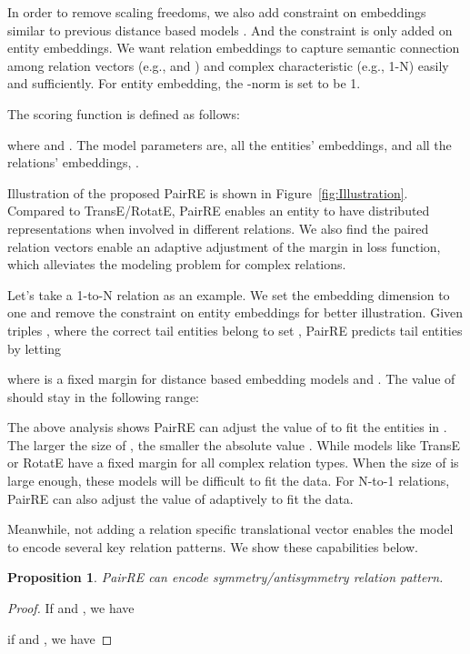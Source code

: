 \documentclass[11pt,a4paper]{article}
\newtheorem{proposition}{Proposition}
\begin{document}
In order to remove scaling freedoms, we also add constraint on embeddings similar to previous distance based models \cite{bordes2013translating,wang2014knowledge, lin2015learning}. And the constraint is only added on entity embeddings. We want relation embeddings to capture semantic connection among relation vectors (e.g.,  and ) and complex characteristic (e.g., 1-N) easily and sufficiently. For entity embedding, the -norm is set to be 1.

The scoring function is defined as follows:

where  and .
The model parameters are, all the entities’ embeddings,  and all the relations’ embeddings,
.

Illustration of the proposed PairRE is shown in Figure~\ref{fig:Illustration}.
Compared to TransE/RotatE, PairRE enables an entity to have distributed representations when involved in different relations. We also find the paired relation vectors enable an adaptive adjustment of the margin in loss function, which alleviates the modeling problem for complex relations. 

Let's take a 1-to-N relation as an example. We set the embedding dimension to one and remove the constraint on entity embeddings for better illustration.
Given triples , where the correct tail entities belong to set , PairRE predicts tail entities by letting 

where  is a fixed margin for distance based embedding models and .
The value of  should stay in the following range: 

The above analysis shows PairRE can adjust the value of  to fit the entities in  . The larger the size of , the smaller the absolute value . While models like TransE or RotatE have a fixed margin for all complex relation types. When the size of  is large enough, these models will be difficult to fit the data. For N-to-1 relations, PairRE can also adjust the value of  adaptively to fit the data.

Meanwhile, not adding a relation specific translational vector enables the model to encode several key relation patterns. We show these capabilities below.

\begin{proposition}
PairRE can encode symmetry/antisymmetry relation pattern.
\end{proposition}

\begin{proof}
If  and , we have

if  and , we have

\end{proof}
\end{document}
